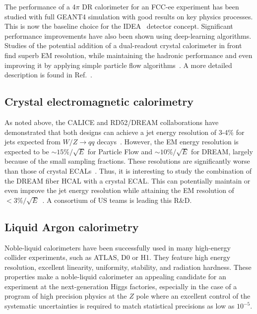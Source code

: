 The performance of a 4$\pi$  DR calorimeter for an FCC-ee experiment has been studied with full GEANT4 simulation with good results on key physics processes.  This is now the baseline choice for the IDEA~\cite{IDEA_tb1} detector concept. Significant performance improvements have also been shown using deep-learning algorithms. Studies of the potential addition of a dual-readout crystal calorimeter in front find superb EM resolution, while maintaining the hadronic performance and even improving it by applying simple particle flow algorithms~\cite{Lucchini_2020}. A more detailed description is found in Ref.~\cite{Aleksa:2021ztd}.

\subsection{Crystal electromagnetic calorimetry}



As noted above, the CALICE and RD52/DREAM collaborations have demonstrated that both designs can achieve a jet energy resolution of 3-4\% for jets expected from $W/Z\to qq$ decays~\cite{Sefkow:2015hna,Antonello:2021tsz}. However, the EM energy resolution is expected to be $\sim 15\%/\sqrt{E}$ for Particle Flow  and $\sim 10\%/\sqrt{E}$ for DREAM, largely because of the small sampling fractions. These resolutions are significantly worse than those of crystal ECALs~\cite{L3BGO:1993tta,CMS:2013lxn}. Thus, it is interesting to study the combination of the DREAM fiber HCAL with a crystal ECAL.   This can potentially  maintain or even improve the jet energy resolution while attaining the EM resolution of $<3\%/\sqrt{E}$~\cite{Lucchini:2020bac}. A consortium of US teams is leading this R\&D.



\subsection{Liquid Argon calorimetry}



Noble-liquid calorimeters have been successfully used in many high-energy collider experiments, such as ATLAS, D0 or H1. They feature high energy resolution, excellent linearity, uniformity, stability, and radiation hardness. These properties make a noble-liquid calorimeter an appealing candidate for an experiment at the next-generation Higgs factories, especially in the case of a program of high precision physics at the $Z$ pole where an excellent control of the systematic uncertainties is required to match statistical precisions as low as $10^{-5}$.

